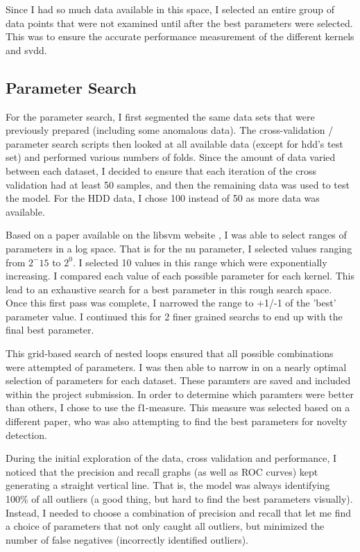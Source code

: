 \documentclass[journal]{IEEEtran}
\begin{document}
Since I had so much data available in this space, I selected an entire group of data points that were not examined until after the best parameters were selected. This was to ensure the accurate performance measurement of the different kernels and svdd.

\subsection{Parameter Search}
For the parameter search, I first segmented the same data sets that were previously prepared (including some anomalous data). The cross-validation / parameter search scripts then looked at all available data (except for hdd's test set) and performed various numbers of folds. Since the amount of data varied between each dataset, I decided to ensure that each iteration of the cross validation had at least 50 samples, and then the remaining data was used to test the model. For the HDD data, I chose 100 instead of 50 as more data was available.

Based on a paper available on the libsvm website \cite{libsvm}, I was able to select ranges of parameters in a log space. That is for the nu parameter, I selected values ranging from $2^-15$ to $2^0$. I selected 10 values in this range which were exponentially increasing. I compared each value of each possible parameter for each kernel. This lead to an exhaustive search for a best parameter in this rough search space. Once this first pass was complete, I narrowed the range to +1/-1 of the 'best' parameter value. I continued this for 2 finer grained searchs to end up with the final best parameter.

This grid-based search of nested loops ensured that all possible combinations were attempted of parameters. I was then able to narrow in on a nearly optimal selection of parameters for each dataset. These paramters are saved and included within the project submission. In order to determine which paramters were better than others, I chose to use the f1-measure. \cite{f1measure} This measure was selected based on a different paper, who was also attempting to find the best parameters for novelty detection.

During the initial exploration of the data, cross validation and performance, I noticed that the precision and recall graphs (as well as ROC curves) kept generating a straight vertical line. That is, the model was always identifying 100\% of all outliers (a good thing, but hard to find the best parameters visually). Instead, I needed to choose a combination of precision and recall that let me find a choice of parameters that not only caught all outliers, but minimized the number of false negatives (incorrectly identified outliers).
\end{document}
